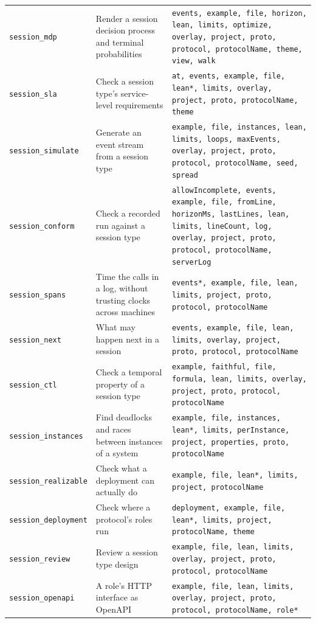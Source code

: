 {\begin{tabular}{@{}p{}p{}p{}@{}}
\texttt{session\_\allowbreak{}mdp} & Render a session decision process and terminal probabilities & \texttt{events, example, file, horizon, lean, limits, optimize, overlay, project, proto, protocol, protocolName, theme, view, walk} \\
\texttt{session\_\allowbreak{}sla} & Check a session type's service-level requirements & \texttt{at, events, example, file, lean*, limits, overlay, project, proto, protocolName, theme} \\
\texttt{session\_\allowbreak{}simulate} & Generate an event stream from a session type & \texttt{example, file, instances, lean, limits, loops, maxEvents, overlay, project, proto, protocol, protocolName, seed, spread} \\
\texttt{session\_\allowbreak{}conform} & Check a recorded run against a session type & \texttt{allowIncomplete, events, example, file, fromLine, horizonMs, lastLines, lean, limits, lineCount, log, overlay, project, proto, protocol, protocolName, serverLog} \\
\texttt{session\_\allowbreak{}spans} & Time the calls in a log, without trusting clocks across machines & \texttt{events*, example, file, lean, limits, project, proto, protocol, protocolName} \\
\texttt{session\_\allowbreak{}next} & What may happen next in a session & \texttt{events, example, file, lean, limits, overlay, project, proto, protocol, protocolName} \\
\texttt{session\_\allowbreak{}ctl} & Check a temporal property of a session type & \texttt{example, faithful, file, formula, lean, limits, overlay, project, proto, protocol, protocolName} \\
\texttt{session\_\allowbreak{}instances} & Find deadlocks and races between instances of a system & \texttt{example, file, instances, lean*, limits, perInstance, project, properties, proto, protocolName} \\
\texttt{session\_\allowbreak{}realizable} & Check what a deployment can actually do & \texttt{example, file, lean*, limits, project, protocolName} \\
\texttt{session\_\allowbreak{}deployment} & Check where a protocol's roles run & \texttt{deployment, example, file, lean*, limits, project, protocolName, theme} \\
\texttt{session\_\allowbreak{}review} & Review a session type design & \texttt{example, file, lean, limits, overlay, project, proto, protocol, protocolName} \\
\texttt{session\_\allowbreak{}openapi} & A role's HTTP interface as OpenAPI & \texttt{example, file, lean, limits, overlay, project, proto, protocol, protocolName, role*} \\

\end{tabular}}
